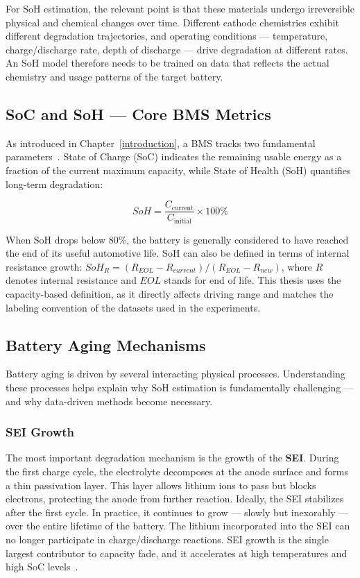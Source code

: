 For SoH estimation, the relevant point is that these materials undergo irreversible physical and chemical changes over time. Different cathode chemistries exhibit different degradation trajectories, and operating conditions --- temperature, charge/discharge rate, depth of discharge --- drive degradation at different rates. An SoH model therefore needs to be trained on data that reflects the actual chemistry and usage patterns of the target battery.

\subsection{SoC and SoH --- Core BMS Metrics}

As introduced in Chapter~\ref{introduction}, a BMS tracks two fundamental parameters~\autocite{gabbar2021}. State of Charge (SoC) indicates the remaining usable energy as a fraction of the current maximum capacity, while State of Health (SoH) quantifies long-term degradation:

\begin{equation}
\label{eq:soh_bg}
SoH = \frac{C_\text{current}}{C_\text{initial}} \times 100\%
\end{equation}

When SoH drops below 80\%, the battery is generally considered to have reached the end of its useful automotive life. SoH can also be defined in terms of internal resistance growth: $SoH_R = (R_{EOL} - R_{current}) / (R_{EOL} - R_{new})$, where $R$ denotes internal resistance and $EOL$ stands for end of life. This thesis uses the capacity-based definition, as it directly affects driving range and matches the labeling convention of the datasets used in the experiments.

\subsection{Battery Aging Mechanisms}

Battery aging is driven by several interacting physical processes. Understanding these processes helps explain why SoH estimation is fundamentally challenging --- and why data-driven methods become necessary.

\subsubsection*{SEI Growth}

The most important degradation mechanism is the growth of the \textbf{\gls{SEI}}. During the first charge cycle, the electrolyte decomposes at the anode surface and forms a thin passivation layer. This layer allows lithium ions to pass but blocks electrons, protecting the anode from further reaction. Ideally, the SEI stabilizes after the first cycle. In practice, it continues to grow --- slowly but inexorably --- over the entire lifetime of the battery. The lithium incorporated into the SEI can no longer participate in charge/discharge reactions. SEI growth is the single largest contributor to capacity fade, and it accelerates at high temperatures and high SoC levels~\autocite{palacin2016}.

